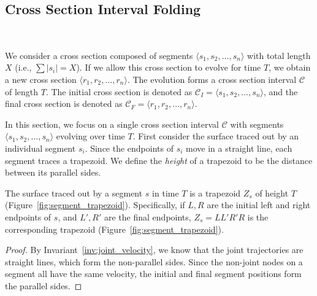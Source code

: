 

\subsection{Cross Section Interval Folding}
\label{sec:interval_folding}

~
\vspace*{-4ex}

\begin{definition}
\label{def:interval}
We consider a cross section composed of segments $ \langle s_1,s_2,\dots,s_n \rangle$
with total length $X$ (i.e., $\sum \left| s_i\right| = X$).
If we allow this cross section to evolve for time $T$, we obtain a new cross section $\langle r_1,r_2,\dots ,r_n \rangle$.
The evolution forms a cross section interval $\mathcal C$ of length $T$.
The initial cross section is denoted as $\mathcal C_I = \langle s_1, s_2,\dots, s_n \rangle$,
and the final cross section is denoted as $\mathcal C_F = \langle r_1, r_2,\dots, r_n \rangle$.
\end{definition}

In this section, we focus on a single cross section interval $\mathcal C$ with segments $\langle s_1, s_2,\dots, s_n \rangle$ evolving over time $T$.
First consider the surface traced out by an individual segment $s_i$.
Since the endpoints of $s_i$ move in a straight line, each segment traces a trapezoid.
We define the \emph{height} of a trapezoid to be the distance between its parallel sides.

\begin{lemma}
\label{lem:trapezoid}
The surface traced out by a segment $s$ in time $T$ is a trapezoid $Z_s$ of height $T$ (Figure~\ref{fig:segment_trapezoid}).
Specifically, if $L,R$ are the initial left and right endpoints of $s$, and $L',R'$ are the final endpoints,
$Z_s = LL'R'R$ is the corresponding trapezoid (Figure~\ref{fig:segment_trapezoid}).
\end{lemma}
\begin{proof}
By Invariant~\ref{inv:joint_velocity}, we know that the joint trajectories are straight lines, which form the non-parallel sides.
Since the non-joint nodes on a segment all have the same velocity, the initial and final segment positions form the parallel sides.
\end{proof}

